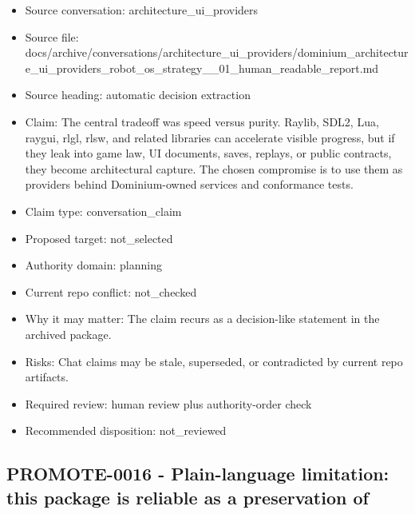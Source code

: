 \documentclass[11pt,a4paper]{report}
\begin{document}
\begin{itemize}
\item Source conversation: architecture\_ui\_providers
\item Source file: docs/archive/conversations/architecture\_ui\_providers/dominium\_architecture\_ui\_providers\_robot\_os\_strategy\_\_01\_human\_readable\_report.md
\item Source heading: automatic decision extraction
\item Claim: The central tradeoff was speed versus purity. Raylib, SDL2, Lua, raygui, rlgl, rlsw, and related libraries can accelerate visible progress, but if they leak into game law, UI documents, saves, replays, or public contracts, they become architectural capture. The chosen compromise is to use them as providers behind Dominium-owned services and conformance tests.
\item Claim type: conversation\_claim
\item Proposed target: not\_selected
\item Authority domain: planning
\item Current repo conflict: not\_checked
\item Why it may matter: The claim recurs as a decision-like statement in the archived package.
\item Risks: Chat claims may be stale, superseded, or contradicted by current repo artifacts.
\item Required review: human review plus authority-order check
\item Recommended disposition: not\_reviewed
\end{itemize}

\subsection{PROMOTE-0016 - Plain-language limitation: this package is reliable as a preservation of}
\end{document}
